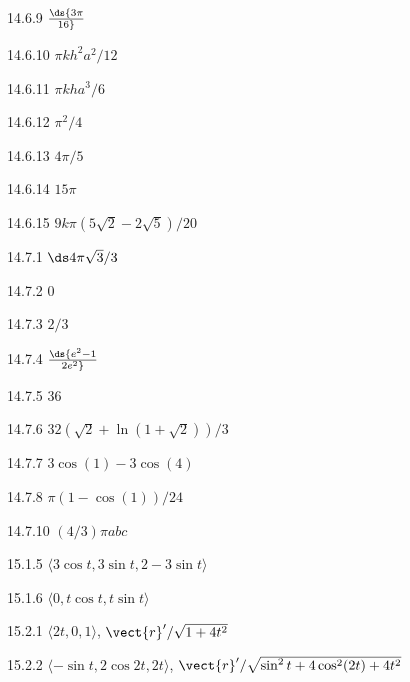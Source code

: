 \begin{Answer}{14.6.9}
$\ds {3\pi\over16}$
\end{Answer}
\begin{Answer}{14.6.10}
$\pi kh^2a^2/12$
\end{Answer}
\begin{Answer}{14.6.11}
$\pi kha^3/6$
\end{Answer}
\begin{Answer}{14.6.12}
$\pi^2/4$
\end{Answer}
\begin{Answer}{14.6.13}
$4\pi/5$
\end{Answer}
\begin{Answer}{14.6.14}
$15\pi$
\end{Answer}
\begin{Answer}{14.6.15}
$9k\pi(5\sqrt2-2\sqrt5)/20$
\end{Answer}
\begin{Answer}{14.7.1}
$\ds 4\pi\sqrt3/3$
\end{Answer}
\begin{Answer}{14.7.2}
$0$
\end{Answer}
\begin{Answer}{14.7.3}
$2/3$
\end{Answer}
\begin{Answer}{14.7.4}
$\ds {e^2-1\over 2e^2}$
\end{Answer}
\begin{Answer}{14.7.5}
$36$
\end{Answer}
\begin{Answer}{14.7.6}
$32(\sqrt2+\ln(1+\sqrt2))/3$
\end{Answer}
\begin{Answer}{14.7.7}
$3\cos(1)-3\cos(4)$
\end{Answer}
\begin{Answer}{14.7.8}
$\pi(1-\cos(1))/24$
\end{Answer}
\begin{Answer}{14.7.10}
$(4/3)\pi abc$
\end{Answer}
\begin{Answer}{15.1.5}
	$\langle 3\cos t, 3\sin t, 2-3\sin t\rangle$
\end{Answer}
\begin{Answer}{15.1.6}
	$\langle 0,t\cos t,t\sin t\rangle$
\end{Answer}
\begin{Answer}{15.2.1}
	$\langle 2t,0,1\rangle$, $\vect{r}'/\sqrt{1+4t^2}$
\end{Answer}
\begin{Answer}{15.2.2}
	$\langle -\sin t, 2\cos 2t,2t\rangle$,
	$\vect{r}'/\sqrt{\sin^2t + 4\cos^2(2t)+4t^2}$
\end{Answer}
